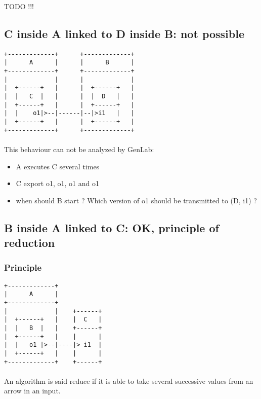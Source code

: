 \documentclass[a4paper,10pt]{book}
\begin{document}
TODO !!!


\subsection{C inside A linked to D inside B: not possible}

\begin{verbatim}
+-------------+      +-------------+
|      A      |      |      B      |
+-------------+      +-------------+
|             |      |             |
|  +------+   |      |  +------+   |
|  |   C  |   |      |  |  D   |   |
|  +------+   |      |  +------+   |
|  |    o1|>--|------|--|>i1   |   |
|  +------+   |      |  +------+   |
+-------------+      +-------------+
\end{verbatim} 

\paragraph*{}
This behaviour can not be analyzed by GenLab:
\begin{itemize}
\item A executes C several times
\item C export o1, o1, o1 and o1
\item when should B start ? Which version of o1 should be transmitted to (D, i1) ? 
\end{itemize}


\subsection{B inside A linked to C: OK, principle of reduction}

\subsubsection{Principle}

\begin{verbatim}
+-------------+
|      A      |
+-------------+
|             |    +------+
|  +------+   |    |  C   |
|  |   B  |   |    +------+
|  +------+   |    |      |
|  |   o1 |>--|----|> i1  |
|  +------+   |    |      |
+-------------+    +------+
\end{verbatim} 

\paragraph*{}
An algorithm is said reduce if it is able to take several successive values from an arrow in an input.
\end{document}
